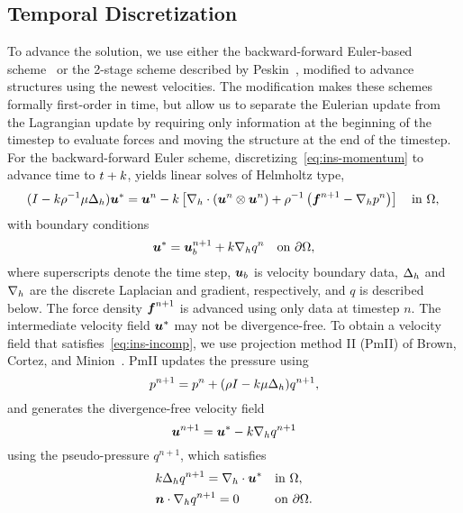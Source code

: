 

\subsection{Temporal Discretization}\label{sec:ns_time}

To advance the solution, we use either the backward-forward Euler-based scheme~%
\cite{Ascher:1997tm} or the 2-stage scheme described by Peskin~\cite{Peskin:2002go},
modified to advance structures using the newest velocities. The modification makes these
schemes formally first-order in time, but allow us to separate the Eulerian update from the
Lagrangian update by requiring only information at the beginning of the timestep to
evaluate forces and moving the structure at the end of the timestep. For the
backward-forward Euler scheme, discretizing~\eqref{eq:ins-momentum} to advance time to
$t+k$, yields linear solves of Helmholtz type,
\begin{equation}\label{eq:disc-momentum}
    (I - \timestep\rho^{-1}\mu \laplacian_h) \u^\ast = \u^n - \timestep\left[\div[h]\left(\u^n\otimes\u^n\right) + \rho^{-1}\left(\f^{n+1} - \grad[h]p^n\right)\right] \quad\text{in}~\domain, \\
\end{equation}
with boundary conditions
\begin{equation}\label{eq:disc-bdy}
    \u^\ast = \u^{n+1}_b + \timestep \grad[h] q^{n} \quad\text{on}~\partial\domain,
\end{equation}
where superscripts denote the time step, $\boldsymbol{u}_b$ is velocity boundary data, $\Delta_h$
and $\grad[h]$ are the discrete Laplacian and gradient, respectively, and $q$ is
described below. The force density $\boldsymbol{f}^{n+1}$ is advanced using only data at timestep
$n$. The intermediate velocity field $\boldsymbol{u}^\ast$ may not be divergence-free. To obtain a
velocity field that satisfies~\eqref{eq:ins-incomp}, we use projection method II (PmII)
of Brown, Cortez, and Minion~\cite{Brown:2001bq}. PmII updates the pressure using
\begin{equation*}
    p^{n+1} = p^n + (\rho I - k\mu\Delta_h)q^{n+1},
\end{equation*}
and generates the divergence-free velocity field
\begin{equation}\label{eq:vel-update}
    \u^{n+1} = \u^\ast - \timestep\grad[h]q^{n+1}
\end{equation}
using the pseudo-pressure $q^{n+1}$, which satisfies
\begin{equation}
\begin{alignedat}{2}
    &k \laplacian_h q^{n+1} = \div[h]\u^\ast &&\quad \text{in}~\domain, \\
    &\n\cdot\grad[h] q^{n+1} = 0                    &&\quad \text{on}~\partial\domain.
\end{alignedat}
\end{equation}
